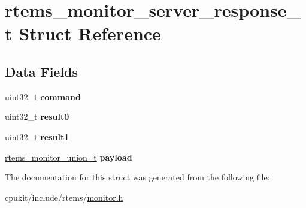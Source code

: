 \hypertarget{structrtems__monitor__server__response__t}{}\section{rtems\+\_\+monitor\+\_\+server\+\_\+response\+\_\+t Struct Reference}
\label{structrtems__monitor__server__response__t}
\subsection*{Data Fields}
\begin{DoxyCompactItemize}
\item 
\mbox{\label{structrtems__monitor__server__response__t_ade008dc1ecfbe1eb79003fd457cffe0e}} 
uint32\+\_\+t {\bfseries command}
\item 
\mbox{\label{structrtems__monitor__server__response__t_ae15a56386817488010a2a1b623ceea09}} 
uint32\+\_\+t {\bfseries result0}
\item 
\mbox{\label{structrtems__monitor__server__response__t_a0c771e3cdbaad616b2e5f1f712062057}} 
uint32\+\_\+t {\bfseries result1}
\item 
\mbox{\label{structrtems__monitor__server__response__t_a383d4119c2020430a5bedd67b3619111}} 
\mbox{\hyperlink{unionrtems__monitor__union__t}{rtems\+\_\+monitor\+\_\+union\+\_\+t}} {\bfseries payload}
\end{DoxyCompactItemize}


The documentation for this struct was generated from the following file\+:\begin{DoxyCompactItemize}
\item 
cpukit/include/rtems/\mbox{\hyperlink{monitor_8h}{monitor.\+h}}\end{DoxyCompactItemize}
